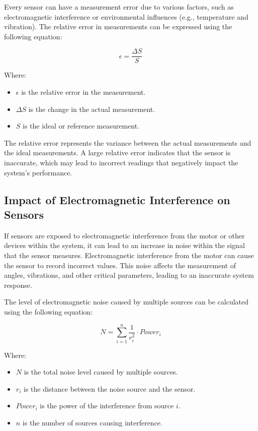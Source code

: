Every sensor can have a measurement error due to various factors, such as electromagnetic interference or environmental influences (e.g., temperature and vibration). The relative error in measurements can be expressed using the following equation:

\[
\epsilon = \frac{\Delta S}{S}
\]

Where:
\begin{itemize}
	\item \( \epsilon \) is the relative error in the measurement.
	\item \( \Delta S \) is the change in the actual measurement.
	\item \( S \) is the ideal or reference measurement.
\end{itemize}

The relative error represents the variance between the actual measurements and the ideal measurements. A large relative error indicates that the sensor is inaccurate, which may lead to incorrect readings that negatively impact the system's performance.

\subsection{Impact of Electromagnetic Interference on Sensors}

If sensors are exposed to electromagnetic interference from the motor or other devices within the system, it can lead to an increase in noise within the signal that the sensor measures. Electromagnetic interference from the motor can cause the sensor to record incorrect values. This noise affects the measurement of angles, vibrations, and other critical parameters, leading to an inaccurate system response.

The level of electromagnetic noise caused by multiple sources can be calculated using the following equation:

\[
N = \sum_{i=1}^{n} \frac{1}{r_i^2} \cdot Power_i
\]

Where:
\begin{itemize}
	\item \( N \) is the total noise level caused by multiple sources.
	\item \( r_i \) is the distance between the noise source and the sensor.
	\item \( Power_i \) is the power of the interference from source \( i \).
	\item \( n \) is the number of sources causing interference.
\end{itemize}

